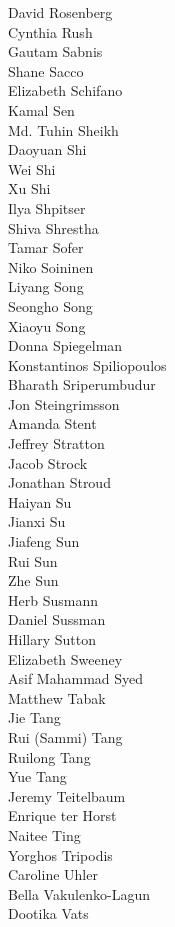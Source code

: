 David Rosenberg\\
Cynthia Rush\\
Gautam Sabnis\\
Shane Sacco\\
Elizabeth Schifano\\
Kamal Sen\\
Md. Tuhin Sheikh\\
Daoyuan Shi\\
Wei Shi\\
Xu Shi\\
Ilya Shpitser\\
Shiva Shrestha\\
Tamar Sofer\\
Niko Soininen\\
Liyang Song\\
Seongho Song\\
Xiaoyu Song\\
Donna Spiegelman\\
Konstantinos Spiliopoulos\\
Bharath Sriperumbudur\\
Jon Steingrimsson\\
Amanda Stent\\
Jeffrey Stratton\\
Jacob Strock\\
Jonathan Stroud\\
Haiyan Su\\
Jianxi Su\\
Jiafeng Sun\\
Rui Sun\\
Zhe Sun\\
Herb Susmann\\
Daniel Sussman\\
Hillary Sutton\\
Elizabeth Sweeney\\
Asif Mahammad Syed\\
Matthew Tabak\\
Jie Tang\\
Rui (Sammi) Tang\\
Ruilong Tang\\
Yue Tang\\
Jeremy Teitelbaum\\
Enrique ter Horst\\
Naitee Ting\\
Yorghos Tripodis\\
Caroline Uhler\\
Bella Vakulenko-Lagun\\
Dootika Vats\\
